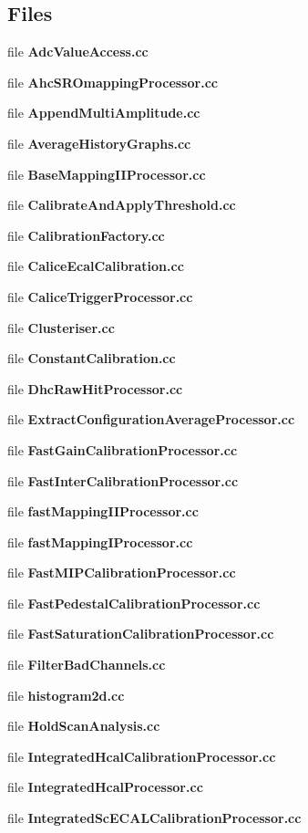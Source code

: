 \subsection*{Files}
\begin{DoxyCompactItemize}
\item 
file {\bfseries AdcValueAccess.cc}
\item 
file {\bfseries AhcSROmappingProcessor.cc}
\item 
file {\bfseries AppendMultiAmplitude.cc}
\item 
file {\bfseries AverageHistoryGraphs.cc}
\item 
file {\bfseries BaseMappingIIProcessor.cc}
\item 
file {\bfseries CalibrateAndApplyThreshold.cc}
\item 
file {\bfseries CalibrationFactory.cc}
\item 
file {\bfseries CaliceEcalCalibration.cc}
\item 
file {\bfseries CaliceTriggerProcessor.cc}
\item 
file {\bfseries Clusteriser.cc}
\item 
file {\bfseries ConstantCalibration.cc}
\item 
file {\bfseries DhcRawHitProcessor.cc}
\item 
file {\bfseries ExtractConfigurationAverageProcessor.cc}
\item 
file {\bfseries FastGainCalibrationProcessor.cc}
\item 
file {\bfseries FastInterCalibrationProcessor.cc}
\item 
file {\bfseries fastMappingIIProcessor.cc}
\item 
file {\bfseries fastMappingIProcessor.cc}
\item 
file {\bfseries FastMIPCalibrationProcessor.cc}
\item 
file {\bfseries FastPedestalCalibrationProcessor.cc}
\item 
file {\bfseries FastSaturationCalibrationProcessor.cc}
\item 
file {\bfseries FilterBadChannels.cc}
\item 
file {\bfseries histogram2d.cc}
\item 
file {\bfseries HoldScanAnalysis.cc}
\item 
file {\bfseries IntegratedHcalCalibrationProcessor.cc}
\item 
file {\bfseries IntegratedHcalProcessor.cc}
\item 
file {\bfseries IntegratedScECALCalibrationProcessor.cc}

\end{DoxyCompactItemize}
